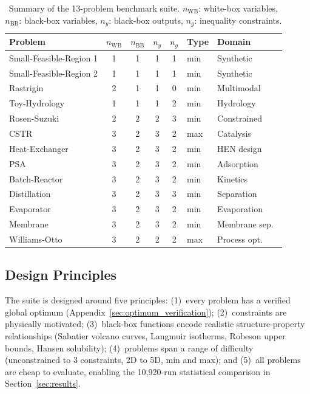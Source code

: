 \documentclass[12pt,a4paper]{article}%
\theoremstyle{plain}%
\theoremstyle{remark}%
\theoremstyle{definition}%
\def\WB{\mathrm{WB}}
\def\BB{\mathrm{BB}}
\begin{document}
\begin{table}[htbp]
\centering
\caption{Summary of the 13-problem benchmark suite. $n_{\WB}$: white-box variables, $n_{\BB}$: black-box variables, $n_y$: black-box outputs, $n_g$: inequality constraints.}
\label{tab:benchmark_summary}
\begin{tabular}{@{}lccccll@{}}
\toprule
\textbf{Problem} & $n_{\WB}$ & $n_{\BB}$ & $n_y$ & $n_g$ & \textbf{Type} & \textbf{Domain} \\
\midrule
Small-Feasible-Region 1 & 1 & 1 & 1 & 1 & min & Synthetic \\
Small-Feasible-Region 2 & 1 & 1 & 1 & 1 & min & Synthetic \\
Rastrigin & 2 & 1 & 1 & 0 & min & Multimodal \\
Toy-Hydrology & 1 & 1 & 1 & 2 & min & Hydrology \\
Rosen-Suzuki & 2 & 2 & 2 & 3 & min & Constrained \\
\midrule
CSTR & 3 & 2 & 3 & 2 & max & Catalysis \\
Heat-Exchanger & 3 & 2 & 3 & 2 & min & HEN design \\
PSA & 3 & 2 & 3 & 2 & min & Adsorption \\
Batch-Reactor & 3 & 2 & 3 & 2 & min & Kinetics \\
Distillation & 3 & 2 & 3 & 3 & min & Separation \\
Evaporator & 3 & 2 & 3 & 2 & min & Evaporation \\
Membrane & 3 & 2 & 3 & 2 & min & Membrane sep.\ \\
Williams-Otto & 3 & 2 & 2 & 2 & max & Process opt.\ \\
\bottomrule
\end{tabular}
\end{table}

\subsection{Design Principles}\label{subsec:design_principles}

The suite is designed around five principles: (1)~every problem has a verified global optimum (Appendix~\ref{sec:optimum_verification}); (2)~constraints are physically motivated; (3)~black-box functions encode realistic structure-property relationships (Sabatier volcano curves, Langmuir isotherms, Robeson upper bounds, Hansen solubility); (4)~problems span a range of difficulty (unconstrained to 3 constraints, 2D to 5D, min and max); and (5)~all problems are cheap to evaluate, enabling the 10{,}920-run statistical comparison in Section~\ref{sec:results}.
\end{document}
